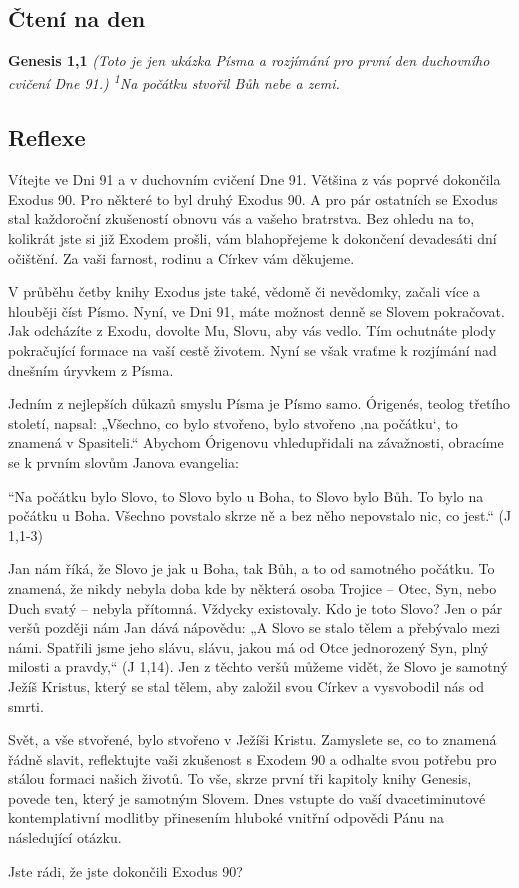 \documentclass[11pt]{article}
\begin{document}
\subsection*{Čtení na den}
\textbf{Genesis 1,1}
\newline
\textit{
  (Toto je jen ukázka Písma a rozjímání pro první den duchovního cvičení Dne 91.)
  \newline
  \newline
\textsuperscript{1}Na počátku stvořil Bůh nebe a zemi.
}

\subsection*{Reflexe}
Vítejte ve Dni 91 a v duchovním cvičení Dne 91. Většina z vás poprvé dokončila Exodus 90. Pro některé to byl druhý
Exodus 90. A pro pár ostatních se Exodus stal každoroční zkušeností obnovu vás a vašeho bratrstva. Bez ohledu na to,
kolikrát jste si již Exodem prošli, vám blahopřejeme k dokončení devadesáti dní očištění. Za vaši farnost, rodinu a
Církev vám děkujeme.

V průběhu četby knihy Exodus jste také, vědomě či nevědomky, začali více a hlouběji číst Písmo. Nyní, ve Dni 91,
máte možnost denně se Slovem pokračovat. Jak odcházíte z Exodu, dovolte Mu, Slovu, aby vás vedlo. Tím ochutnáte
plody pokračující formace na vaší cestě životem. Nyní se však vraťme k rozjímání nad dnešním úryvkem z Písma.

Jedním z nejlepších důkazů smyslu Písma je Písmo samo. Órigenés, teolog třetího století, napsal: „Všechno, co bylo
stvořeno, bylo stvořeno ‚na počátku‘, to znamená v Spasiteli.“ Abychom Órigenovu vhledupřidali na závažnosti,
obracíme se k prvním slovům Janova evangelia:

“Na počátku bylo Slovo, to Slovo bylo u Boha, to Slovo bylo Bůh. To bylo na počátku u Boha. Všechno povstalo skrze
ně a bez něho nepovstalo nic, co jest.“ (J 1,1-3)

Jan nám říká, že Slovo je jak u Boha, tak Bůh, a to od samotného počátku. To znamená, že nikdy nebyla doba kde by
některá osoba Trojice – Otec, Syn, nebo Duch svatý – nebyla přítomná. Vždycky existovaly. Kdo je toto Slovo? Jen o
pár veršů později nám Jan dává nápovědu: „A Slovo se stalo tělem a přebývalo mezi námi. Spatřili jsme jeho slávu,
slávu, jakou má od Otce jednorozený Syn, plný milosti a pravdy,“ (J 1,14). Jen z těchto veršů můžeme vidět, že Slovo
je samotný Ježíš Kristus, který se stal tělem, aby založil svou Církev a vysvobodil nás od smrti.

Svět, a vše stvořené, bylo stvořeno v Ježíši Kristu. Zamyslete se, co to znamená řádně slavit, reflektujte vaši zkušenost
s Exodem 90 a odhalte svou potřebu pro stálou formaci našich životů. To vše, skrze první tři kapitoly knihy Genesis,
povede ten, který je samotným Slovem. Dnes vstupte do vaší dvacetiminutové kontemplativní modlitby přinesením
hluboké vnitřní odpovědi Pánu na následující otázku.

Jste rádi, že jste dokončili Exodus 90?
\end{document}
